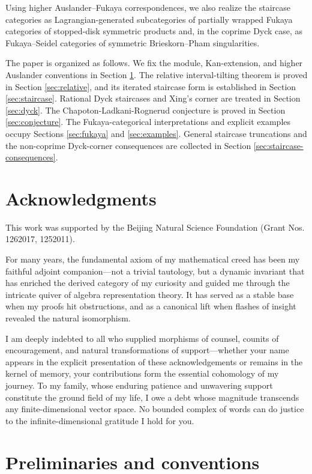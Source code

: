 \documentclass[12pt,a4paper,english,reqno]{amsart}
\theoremstyle{plain}
\theoremstyle{definition}
\begin{document}
Using higher Auslander--Fukaya correspondences, we also realize the staircase
categories as Lagrangian-generated subcategories of partially wrapped Fukaya
categories of stopped-disk symmetric products and, in the coprime Dyck case,
as Fukaya--Seidel categories of symmetric Brieskorn--Pham singularities.


The paper is organized as follows.  We fix the module, Kan-extension, and
higher Auslander conventions in Section \ref{sec:preliminaries}.  The relative
interval-tilting theorem is proved in Section \ref{sec:relative}, and its iterated
staircase form is established in Section \ref{sec:staircase}.  Rational Dyck
staircases and Xing's corner are treated in Section \ref{sec:dyck}.  The
Chapoton-Ladkani-Rognerud conjecture is proved in Section \ref{sec:conjecture}.
The Fukaya-categorical interpretations and explicit examples occupy Sections \ref{sec:fukaya} and \ref{sec:examples}.  General staircase truncations and the
non-coprime Dyck-corner consequences are collected in Section 
\ref{sec:staircase-consequences}.


\section*{Acknowledgments}

This work was supported by the Beijing Natural Science Foundation (Grant Nos. 1262017, 1252011).

For many years, the fundamental axiom of my mathematical creed has been my faithful adjoint companion—not a trivial tautology, but a dynamic invariant that has enriched the derived category of my curiosity and guided me through the intricate quiver of algebra representation theory. It has served as a stable base when my proofs hit obstructions, and as a canonical lift when flashes of insight revealed the natural isomorphism.

I am deeply indebted to all who supplied morphisms of counsel, counits of encouragement, and natural transformations of support—whether your name appears in the explicit presentation of these acknowledgements or remains in the kernel of memory, your contributions form the essential cohomology of my journey. To my family, whose enduring patience and unwavering support constitute the ground field of my life, I owe a debt whose magnitude transcends any finite-dimensional vector space. No bounded complex of words can do justice to the infinite-dimensional gratitude I hold for you.

\section{Preliminaries and conventions}
\label{sec:preliminaries}
\end{document}
